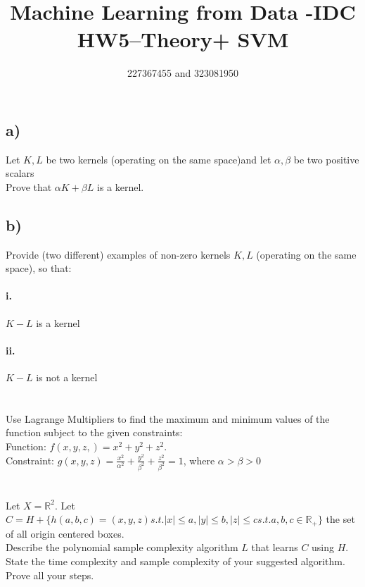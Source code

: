 \documentclass[12pt]{article}
\title{Machine Learning from Data -IDC\\HW5–Theory+ SVM}
\author{227367455 and 323081950}
\newcommand\tab[1][1cm]{\hspace*{#1}}
\begin{document}
\maketitle

\section*{}

\subsection*{a)}

Let $K,L$ be two kernels (operating on the same space)and let $ \alpha, \beta $ be two positive scalars \\
		Prove that $\alpha K + \beta L $ is a kernel.
		
\subsection*{b)}

Provide (two different) examples of non-zero kernels $K,L$ (operating on the same space), so that:

\paragraph{\tab i.}

$K - L$ is a kernel

\paragraph{\tab ii.}

$K - L$ is not a kernel


\section*{}


\tab Use Lagrange Multipliers to find the maximum and minimum values of the function subject to the given constraints: \\
\tab Function: $f(x,y,z,) = x^2 + y^2 + z^2$.  \\
\tab Constraint: $g(x,y,z) = \frac{x^2}{\alpha^2} + \frac{y^2}{\beta^2} + \frac{z^2}{\beta^2} = 1$, where $ \alpha > \beta > 0$ 



\section*{}


\tab Let $X = \mathbb{R}^2$. Let $ C = H + \{h(a,b,c) = {(x,y,z) s.t. |x| \leq a, |y| \leq b, |z| \leq c} s.t. a,b,c \in \mathbb{R}_+\}$ the set of all origin centered boxes. \\
\tab Describe the polynomial sample complexity algorithm $L$ that learns $C$ using $H$. State the time complexity and sample complexity of your suggested algorithm. Prove all your steps.
\end{document}
